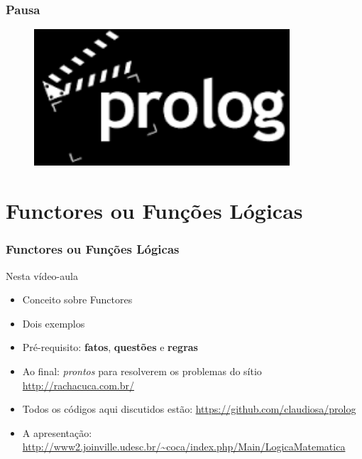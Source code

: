 \documentclass[sans]{beamer}
\begin{document}
\begin{frame}[fragile]   %
\frametitle{Pausa}

\begin{figure}[!htb]
\centering
\includegraphics[width=0.85\textwidth , height=0.65\textheight]{figuras/the_end_video.png}
\end{figure}



\end{frame}



\section{Functores ou Funções Lógicas} 
\begin{frame}[fragile]   %
\frametitle{Functores ou Funções Lógicas}


\begin{block}{Nesta vídeo-aula}
\begin{itemize}
\itemsep 0.5cm

\item Conceito sobre Functores
\item Dois exemplos
\item Pré-requisito: \textbf{fatos}, \textbf{questões} e \textbf{regras}
\item Ao final: \textit{prontos} para resolverem os problemas do sítio \url{http://rachacuca.com.br/}
\item Todos os códigos aqui discutidos estão: \url{https://github.com/claudiosa/prolog}
\item A apresentação: \url{http://www2.joinville.udesc.br/~coca/index.php/Main/LogicaMatematica}
\end{itemize}

\end{block}   
\end{frame}
\end{document}
